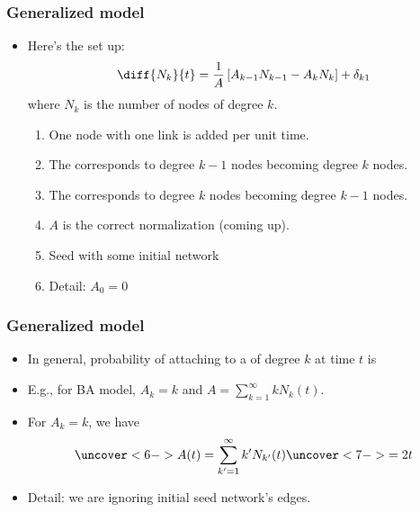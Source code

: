 \begin{frame}
  \frametitle{Generalized model}

  \begin{block}{}
    \begin{itemize}
    \item<+->
      Here's the set up:
      $$
      \diff{N_k}{t}
      =
      \frac{1}{A}
      \left[
        A_{k-1} N_{k-1} - A_{k} N_{k}
      \right]
      + \delta_{k1}
      $$
      where $N_k$ is the number of nodes of degree $k$.
      \begin{enumerate}
      \item<+->
        One node with one link is added per unit time.
      \item<+-> 
        The  corresponds to 
        degree $k-1$ nodes becoming degree $k$ nodes.
      \item<+-> 
        The  corresponds to 
        degree $k$ nodes becoming degree $k-1$ nodes.
      \item<+->
        $A$ is the correct normalization (coming up).
      \item<+-> 
        Seed with some initial network\\
      \item<+-> 
        Detail: $A_0=0$
      \end{enumerate}
    \end{itemize}
  \end{block}

\end{frame}


\begin{frame}[label=]
  \frametitle{Generalized model}  
  
  \begin{block}{}
  \begin{itemize}
  \item<1->
    In general, probability of attaching to a 
    of degree $k$ at time $t$ is
  \item<4->
    E.g., for BA model, $A_k = k$ and $A = \sum_{k=1}^{\infty} k N_k(t)$.
  \item<5-> For $A_k=k$, we have
    $$
    \uncover<6->{
    A(t) 
    = 
    \sum_{k'=1}^{\infty}
    k' N_{k'}(t)
    }
    \uncover<7->{
    = 2t     
    }
    $$
  \item<9->
      Detail: we are ignoring initial seed network's edges.
  \end{itemize}
  \end{block}

\end{frame}



